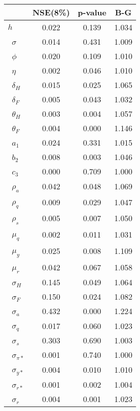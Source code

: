 \begin{tiny}\begin{tabular}{lccc}
\hline
&\textbf{NSE(8\%)}&\textbf{p-value}&\textbf{B-G}\\\hline
\textbf{$ h             $}&0.022&0.139&1.034\\\
\textbf{$ \sigma        $}&0.014&0.431&1.009\\\
\textbf{$ \phi          $}&0.020&0.109&1.010\\\
\textbf{$ \eta          $}&0.002&0.046&1.010\\\
\textbf{$ \delta_{H}    $}&0.015&0.025&1.065\\\
\textbf{$ \delta_{F}    $}&0.005&0.043&1.032\\\
\textbf{$ \theta_{H}    $}&0.003&0.004&1.057\\\
\textbf{$ \theta_{F}    $}&0.004&0.000&1.146\\\
\textbf{$ a_{1}         $}&0.024&0.331&1.015\\\
\textbf{$ b_{2}         $}&0.008&0.003&1.046\\\
\textbf{$ c_{3}         $}&0.000&0.709&1.000\\\
\textbf{$ \rho_{a}      $}&0.042&0.048&1.069\\\
\textbf{$ \rho_{q}      $}&0.009&0.029&1.047\\\
\textbf{$ \rho_{s}      $}&0.005&0.007&1.050\\\
\textbf{$ \mu_{q}       $}&0.002&0.011&1.031\\\
\textbf{$ \mu_{y}       $}&0.025&0.008&1.109\\\
\textbf{$ \mu_{r}       $}&0.042&0.067&1.058\\\
\textbf{$ \sigma_{H}    $}&0.145&0.049&1.064\\\
\textbf{$ \sigma_{F}    $}&0.150&0.024&1.082\\\
\textbf{$ \sigma_{a}    $}&0.432&0.000&1.224\\\
\textbf{$ \sigma_{q}    $}&0.017&0.060&1.023\\\
\textbf{$ \sigma_{s}    $}&0.303&0.690&1.003\\\
\textbf{$ \sigma_{\pi*} $}&0.001&0.740&1.000\\\
\textbf{$ \sigma_{y*}   $}&0.004&0.010&1.010\\\
\textbf{$ \sigma_{r*}   $}&0.001&0.002&1.004\\\
\textbf{$ \sigma_{r}    $}&0.004&0.001&1.023\\\hline
\end{tabular}
\end{tiny}